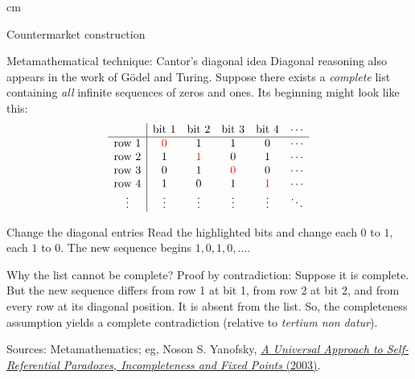 \documentclass{beamer}
\newcommand{\doiref}[2]{%
  \href{https://doi.org/#1}{\textcolor{blue!65!black}{#2}}}
\newcommand{\sourcefoot}[1]{%
  \par\vfill{\fontsize{6.3}{7.5}\selectfont\color{black!65}Sources: #1\par}}
\begin{document}
\begin{frame}
 cm
\begin{center}
\Large\color{blue}
Countermarket construction
\end{center}
\end{frame}

\begin{frame}[shrink=8]{Metamathematical technique: Cantor's diagonal idea}
\small
Diagonal reasoning also appears in the work of G\"odel and Turing.
Suppose there exists a \emph{complete} list containing \emph{all} infinite sequences of zeros and
ones. Its beginning might look like this:
\[
\begin{array}{c|ccccc}
 & \text{bit 1}&\text{bit 2}&\text{bit 3}&\text{bit 4}&\cdots\\\hline
\text{row 1}&\textcolor{red}{0}&1&1&0&\cdots\\
\text{row 2}&1&\textcolor{red}{1}&0&1&\cdots\\
\text{row 3}&0&1&\textcolor{red}{0}&0&\cdots\\
\text{row 4}&1&0&1&\textcolor{red}{1}&\cdots\\
\vdots&\vdots&\vdots&\vdots&\vdots&\ddots
\end{array}
\]
\begin{exampleblock}{Change the diagonal entries}
Read the highlighted bits and change each $0$ to $1$, each $1$ to $0$.
The new sequence begins $1,0,1,0,\ldots$.
\end{exampleblock}
\begin{alertblock}{Why the list cannot be complete?}
Proof by contradiction: Suppose it is complete.
But the new sequence differs from row 1 at bit 1, from row 2 at bit 2,
and from every row at its diagonal position. It is absent from the list.  So, the completeness assumption yields a complete contradiction (relative to \textit{tertium non datur}).
\end{alertblock}
\sourcefoot{Metamathematics; eg, Noson S. Yanofsky,
\doiref{10.2178/bsl/1058448677}{\emph{A Universal Approach to Self-Referential Paradoxes, Incompleteness and Fixed Points} (2003)}.}
\end{frame}
\end{document}
